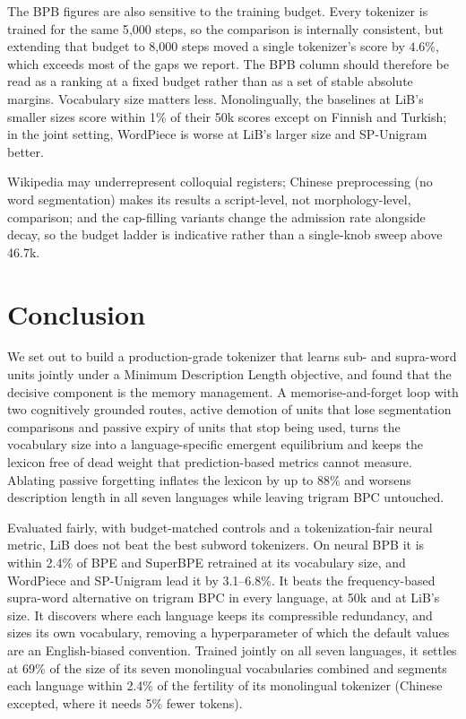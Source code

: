 \documentclass[pdflatex,sn-apa]{sn-jnl}
\begin{document}
The BPB figures are also sensitive to the training budget. Every tokenizer is
trained for the same 5{,}000 steps, so the comparison is internally
consistent, but extending that budget to 8{,}000 steps moved a single
tokenizer's score by $4.6\%$, which exceeds most of the gaps we report. The
BPB column should therefore be read as a ranking at a fixed budget rather
than as a set of stable absolute margins. Vocabulary size matters less.
Monolingually, the baselines at LiB's smaller sizes score within 1\% of
their 50k scores except on Finnish and Turkish; in the joint setting,
WordPiece is worse at LiB's larger size and SP-Unigram better.

Wikipedia may underrepresent colloquial registers; Chinese preprocessing
(no word segmentation) makes its results a script-level, not
morphology-level, comparison; and the cap-filling variants change the
admission rate alongside decay, so the budget ladder is indicative rather
than a single-knob sweep above 46.7k.


\section{Conclusion}
\label{sec:conclusion}

We set out to build a production-grade tokenizer that learns sub- and
supra-word units jointly under a Minimum Description Length objective, and
found that the decisive component is the memory management. A memorise-and-forget loop with two cognitively grounded routes, active
demotion of units that lose segmentation comparisons and passive expiry of
units that stop being used, turns the vocabulary size into a language-specific
emergent equilibrium and keeps the lexicon free of dead weight that
prediction-based metrics cannot measure.
Ablating passive forgetting inflates the lexicon by up to 88\% and worsens
description length in all seven languages while leaving trigram BPC
untouched.

Evaluated fairly, with budget-matched controls and a tokenization-fair
neural metric, LiB does not beat the best subword tokenizers.
On neural BPB it is within 2.4\% of BPE and SuperBPE retrained at its
vocabulary size, and WordPiece and SP-Unigram lead it by 3.1--6.8\%. It beats the
frequency-based supra-word alternative on trigram BPC in every language, at
50k and at LiB's size. It
discovers where each language keeps its compressible redundancy, and sizes
its own vocabulary, removing a hyperparameter of which the default values are an English-biased convention.
Trained jointly on all seven languages, it settles at 69\% of the size of
its seven monolingual vocabularies combined and segments each language
within 2.4\% of the fertility of its monolingual tokenizer (Chinese
excepted, where it needs 5\% fewer tokens).
\end{document}
